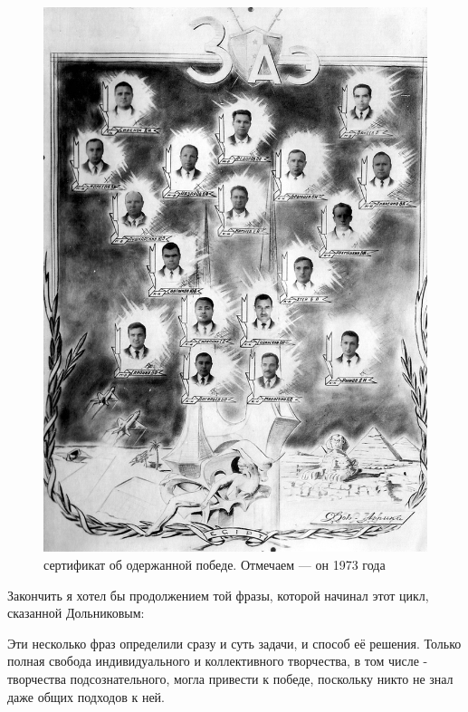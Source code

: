 \begin{figure}[h!tb] 
	\centering\includegraphics[scale=0.25]{Dolina_5/Nzt1_-t0RiE.jpg}
	\caption{сертификат об одержанной победе. Отмечаем — он 1973 года}%
\end{figure}

Закончить я хотел бы продолжением той фразы, которой начинал этот цикл, сказанной Дольниковым:

\begin{textcitation}
	Эти несколько фраз определили сразу и суть задачи, и способ её решения. Только полная свобода индивидуального и коллективного творчества, в том числе - творчества подсознательного, могла привести к победе, поскольку никто не знал даже общих подходов к ней.
\end{textcitation}


